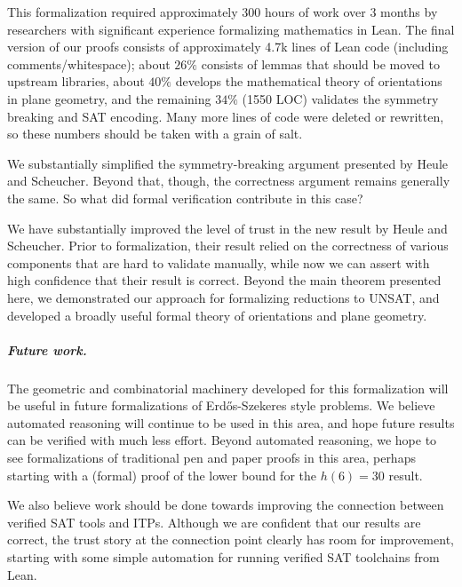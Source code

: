 This formalization required approximately 300 hours of work over 3 months
by researchers with significant experience formalizing mathematics in Lean.
The final version of our proofs consists of approximately 4.7k lines of Lean code
(including comments/whitespace);
about $26\%$ consists of lemmas that should be moved to upstream libraries,
about $40\%$ develops the mathematical theory of orientations in plane geometry,
and the remaining $34\%$ (1550 LOC) validates the symmetry breaking and SAT encoding.
Many more lines of code were deleted or rewritten,
so these numbers should be taken with a grain of salt.

We substantially simplified the symmetry-breaking argument presented by Heule and Scheucher.
Beyond that, though, the correctness argument remains generally the same.
So what did formal verification contribute in this case?

We have substantially improved the level of trust in the new result by Heule and Scheucher.
Prior to formalization,
their result relied on the correctness of various components that are hard to validate manually,
while now we can assert with high confidence that their result is correct.
Beyond the main theorem presented here,
we demonstrated our approach for formalizing reductions to UNSAT,
and developed a broadly useful formal theory of orientations and plane geometry.

\subparagraph*{Future work.}
The geometric and combinatorial machinery developed for this formalization
will be useful in future formalizations of Erd\H{o}s-Szekeres style problems.
We believe automated reasoning will continue to be used in this area,
and hope future results can be verified with much less effort.
Beyond automated reasoning,
we hope to see formalizations of traditional pen and paper proofs in this area,
perhaps starting with a (formal) proof of the lower bound for the $h(6) = 30$ result.

We also believe work should be done towards improving the connection between verified SAT tools and ITPs.
Although we are confident that our results are correct,
the trust story at the connection point clearly has room for improvement,
starting with some simple automation for running verified SAT toolchains from Lean.

